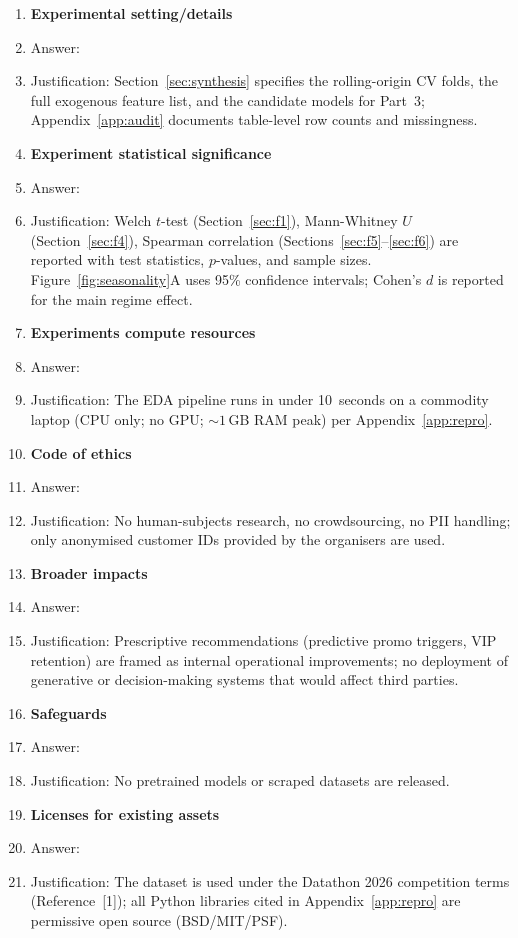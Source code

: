 \documentclass{article}
\begin{document}
\begin{enumerate}
\item {\bf Experimental setting/details}
    \item[] Answer: \answerYes{}
    \item[] Justification: Section~\ref{sec:synthesis} specifies the rolling-origin CV folds, the full exogenous feature list, and the candidate models for Part~3; Appendix~\ref{app:audit} documents table-level row counts and missingness.

\item {\bf Experiment statistical significance}
    \item[] Answer: \answerYes{}
    \item[] Justification: Welch $t$-test (Section~\ref{sec:f1}), Mann-Whitney $U$ (Section~\ref{sec:f4}), Spearman correlation (Sections~\ref{sec:f5}--\ref{sec:f6}) are reported with test statistics, $p$-values, and sample sizes. Figure~\ref{fig:seasonality}A uses 95\% confidence intervals; Cohen's $d$ is reported for the main regime effect.

\item {\bf Experiments compute resources}
    \item[] Answer: \answerYes{}
    \item[] Justification: The EDA pipeline runs in under 10~seconds on a commodity laptop (CPU only; no GPU; $\sim\!1$\,GB RAM peak) per Appendix~\ref{app:repro}.

\item {\bf Code of ethics}
    \item[] Answer: \answerYes{}
    \item[] Justification: No human-subjects research, no crowdsourcing, no PII handling; only anonymised customer IDs provided by the organisers are used.

\item {\bf Broader impacts}
    \item[] Answer: \answerYes{}
    \item[] Justification: Prescriptive recommendations (predictive promo triggers, VIP retention) are framed as internal operational improvements; no deployment of generative or decision-making systems that would affect third parties.

\item {\bf Safeguards}
    \item[] Answer: \answerNA{}
    \item[] Justification: No pretrained models or scraped datasets are released.

\item {\bf Licenses for existing assets}
    \item[] Answer: \answerYes{}
    \item[] Justification: The dataset is used under the Datathon 2026 competition terms (Reference~[1]); all Python libraries cited in Appendix~\ref{app:repro} are permissive open source (BSD/MIT/PSF).


\end{enumerate}
\end{document}
